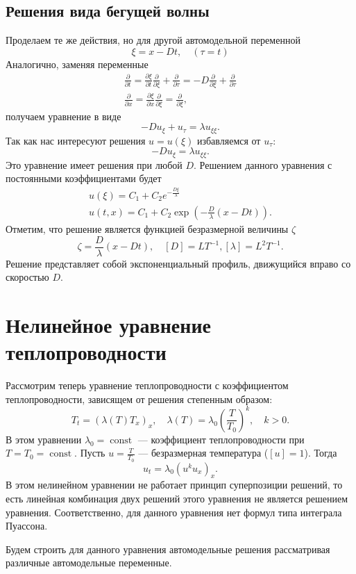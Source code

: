 \documentclass[12pt]{article}
\newcommand{\pd}[2]{\frac{\partial #1}{\partial #2}}
\newcommand{\const}{\operatorname{const}}
\begin{document}
\subsection{Решения вида бегущей волны}
Проделаем те же действия, но для другой автомодельной переменной
\[
\xi = x - D t, \quad (\tau = t)
\]
Аналогично, заменяя переменные
\begin{gather*}
\pd{}{t} = \pd{\xi}{t} \pd{}{\xi} + \pd{}{\tau} = -D\pd{}{\xi} + \pd{}{\tau}\\
\pd{}{x} = \pd{\xi}{x} \pd{}{\xi} = \pd{}{\xi},
\end{gather*}
получаем уравнение в виде
\[
-D u_\xi + u_\tau = \lambda u_{\xi\xi}.
\]
Так как нас интересуют решения $u = u(\xi)$ избавляемся от $u_\tau$:
\[
-D u_\xi = \lambda u_{\xi\xi}.
\]
Это уравнение имеет решения при любой $D$. Решением данного уравнения с постоянными коэффициентами будет
\begin{gather*}
u(\xi) = C_1 + C_2 e^{-\frac{D \xi}{\lambda}}\\
u(t, x) = C_1 + C_2 \exp\left(-\frac{D}{\lambda}(x - D t)\right).
\end{gather*}
Отметим, что решение является функцией безразмерной величины $\zeta$
\[
\zeta = \frac{D}{\lambda}(x - D t), \quad [D] = LT^{-1}, [\lambda] = L^2T^{-1}.
\]
Решение представляет собой экспоненциальный профиль, движущийся вправо со скоростью $D$.

\section{Нелинейное уравнение теплопроводности}

Рассмотрим теперь уравнение теплопроводности с коэффициентом теплопроводности, зависящем от решения степенным образом:
\[
T_t = (\lambda(T) T_x)_x, \quad \lambda(T) = \lambda_0 \left(\frac{T}{T_0}\right)^k, \quad k > 0.
\]
В этом уравнении $\lambda_0 = \const$ --- коэффициент теплопроводности при $T = T_0 = \const$. Пусть $u = \frac{T}{T_0}$ --- безразмерная температура ($[u] = 1$). Тогда
\[
u_t = \lambda_0 (u^k u_x)_x.
\]
В этом нелинейном уравнении не работает принцип суперпозиции решений, то есть линейная комбинация двух решений этого уравнения не является решением уравнения. Соответственно, для данного уравнения нет формул типа интеграла Пуассона.

Будем строить для данного уравнения автомодельные решения рассматривая различные автомодельные переменные.
\end{document}
